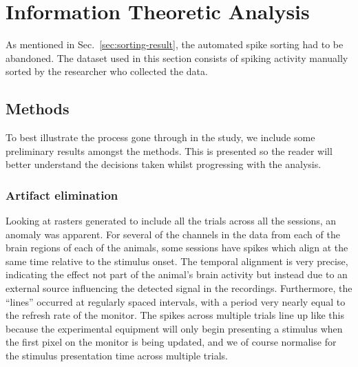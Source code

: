 \section{Information Theoretic Analysis}

As mentioned in Sec.~\ref{sec:sorting-result}, the automated spike sorting had to be abandoned. The dataset used in this section consists of spiking activity manually sorted by the researcher who collected the data.

\subsection{Methods}

To best illustrate the process gone through in the study, we include some preliminary results amongst the methods.
This is presented so the reader will better understand the decisions taken whilst progressing with the analysis.

\FloatBarrier
\subsubsection{Artifact elimination}
\label{sec:ma}

Looking at rasters generated to include all the trials across all the sessions, an anomaly was apparent.
For several of the channels in the data from each of the brain regions of each of the animals, some sessions have spikes which align at the same time relative to the stimulus onset. The temporal alignment is very precise, indicating the effect not part of the animal's brain activity but instead due to an external source influencing the detected signal in the recordings. Furthermore, the ``lines'' occurred at regularly spaced intervals, with a period very nearly equal to the refresh rate of the monitor. The spikes across multiple trials line up like this because the experimental equipment will only begin presenting a stimulus when the first pixel on the monitor is being updated, and we of course normalise for the stimulus presentation time across multiple trials.

